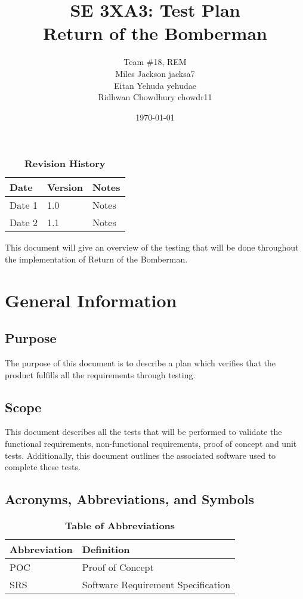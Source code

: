 \documentclass[12pt, titlepage]{article}
\title{SE 3XA3: Test Plan\\Return of the Bomberman}
\author{Team \#18, REM
		\\ Miles Jackson  jacksa7
		\\ Eitan Yehuda  yehudae
		\\ Ridhwan Chowdhury chowdr11
}
\date{\today}
\begin{document}
\maketitle

\tableofcontents
\listoftables
\listoffigures

\begin{table}[bp]
\caption{\bf Revision History}
\begin{tabularx}{\textwidth}{p{3cm}p{2cm}X}
\toprule {\bf Date} & {\bf Version} & {\bf Notes}\\
\midrule
Date 1 & 1.0 & Notes\\
Date 2 & 1.1 & Notes\\
\bottomrule
\end{tabularx}
\end{table}

\newpage


\parindent

This document will give an overview of the testing that will be done throughout the implementation of Return of the Bomberman.

\section{General Information}

\subsection{Purpose}
The purpose of this document is to describe a plan which verifies that the product fulfills all the requirements through testing.

\subsection{Scope}
This document describes all the tests that will be performed to validate the functional requirements, non-functional requirements, proof of concept and unit tests. Additionally, this document outlines the associated software used to complete these tests.

\subsection{Acronyms, Abbreviations, and Symbols}
	
\begin{table}[hbp]
\caption{\textbf{Table of Abbreviations}} \label{Table}

\begin{tabularx}{\textwidth}{p{3cm}X}
\toprule
\textbf{Abbreviation} & \textbf{Definition} \\
\midrule
POC & Proof of Concept\\
SRS & Software Requirement Specification\\
\bottomrule
\end{tabularx}

\end{table}
\end{document}
